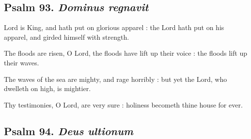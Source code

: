 \subsection{Psalm 93. \textit{Dominus regnavit}}

 Lord is King, and hath put on glorious apparel : the Lord hath put on his apparel, and girded himself with strength.\par
{}
The floods are risen, O Lord, the floods have lift up their voice : the floods lift up their waves.\par
{}The waves of the sea are mighty, and rage horribly : but yet the Lord, who dwelleth on high, is mightier.\par
{}Thy testimonies, O Lord, are very sure : holiness becometh thine house for ever.\par

\subsection{Psalm 94. \textit{Deus ultionum}}

